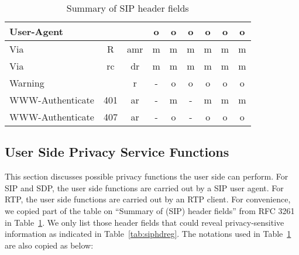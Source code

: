 \documentclass[letterpaper,notitlepage,times,12pt]{article}
\begin{document}
\begin{table}[!h]
\begin{center}
\begin{tabular}{|l|c|c|c|c|c|c|c|c|}
{\sf User-Agent} & & & o & o & o & o & o & o \\ \hline
{\sf Via} & R & amr & m & m & m & m & m & m \\
{\sf Via} & rc & dr & m & m & m & m & m & m \\ \hline
{\sf Warning} & & r & - & o & o & o & o & o \\ \hline
{\sf WWW-Authenticate} & 401 & ar & - & m & - & m & m & m \\
{\sf WWW-Authenticate} & 407 & ar & - & o & - & o & o & o \\ \hline
\end{tabular}
\end{center}
\caption{Summary of SIP header fields}\label{tab:sumhdr}
\end{table}

\subsection{User Side Privacy Service Functions} \label{sec:ups}

This section discusses possible privacy functions the user side can perform.
For SIP and SDP, the user side functions are carried out by a SIP user agent. For RTP, the user side functions are carried out by an RTP client.
For convenience, we copied part of the table on ``Summary of (SIP) header fields'' from RFC 3261 in Table~\ref{tab:sumhdr}. We only list those header fields that could reveal privacy-sensitive information as indicated in Table~\ref{tab:siphdreg}. The notations used in Table~\ref{tab:sumhdr} are also copied as below:
\end{document}
